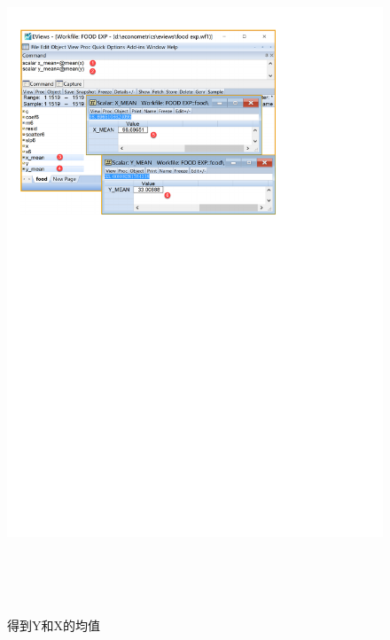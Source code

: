 \documentclass[12pt,(landscape,a4paper),(portrait,a4paper)]{article}
\begin{document}
\begin{figure}

{\centering \includegraphics[width=24.24in,height=8in]{picture/lab3-model-function/mean6} 

}

\caption{得到Y和X的均值}\label{fig:mean6}
\end{figure}
\end{document}
